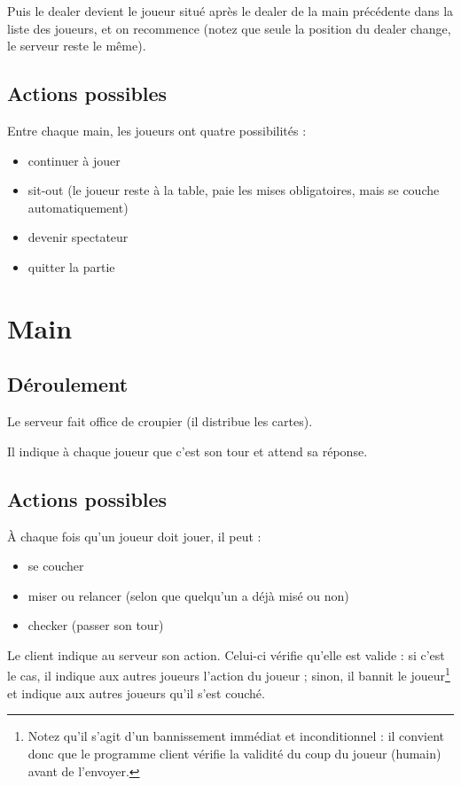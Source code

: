 \documentclass[a4paper]{article}
\begin{document}
Puis le dealer devient le joueur situé après le dealer de la main précédente dans la liste des joueurs, et on recommence (notez que seule la position du dealer change, le serveur reste le même).

\subsection{Actions possibles}

Entre chaque main, les joueurs ont quatre possibilités :
\begin{itemize}
	\item continuer à jouer
	\item sit-out (le joueur reste à la table, paie les mises obligatoires, mais se couche automatiquement)
	\item devenir spectateur
	\item quitter la partie
\end{itemize}

\section{Main}

\subsection{Déroulement}

Le serveur fait office de croupier (il distribue les cartes).

Il indique à chaque joueur que c'est son tour et attend sa réponse.

\subsection{Actions possibles}

À chaque fois qu'un joueur doit jouer, il peut :
\begin{itemize}
	\item se coucher
	\item miser ou relancer (selon que quelqu'un a déjà misé ou non)
	\item checker (passer son tour)
\end{itemize}

Le client indique au serveur son action.
Celui-ci vérifie qu'elle est valide : si c'est le cas, il indique aux autres joueurs l'action du joueur ; sinon, il bannit le joueur\footnote{Notez qu'il s'agit d'un bannissement immédiat et inconditionnel : il convient donc que le programme client vérifie la validité du coup du joueur (humain) avant de l'envoyer.} et indique aux autres joueurs qu'il s'est couché.
\end{document}
